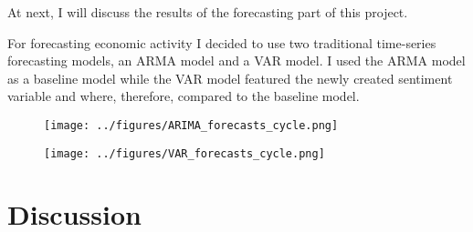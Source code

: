 \documentclass[11pt, a4paper, leqno]{article}
\begin{document}
At next, I will discuss the results of the forecasting part of this project.

For forecasting economic activity I decided to use two traditional time-series forecasting models, an ARMA model and a VAR model. I used the ARMA model as a baseline model while the VAR model featured the newly created sentiment variable and where, therefore, compared to the baseline model.








\begin{figure}[h!]
    \texttt{[image: ../figures/ARIMA\_forecasts\_cycle.png]}
\end{figure}
\newpage
\begin{figure}[h!]
    \texttt{[image: ../figures/VAR\_forecasts\_cycle.png]}
\end{figure}




\section{Discussion}
\end{document}
